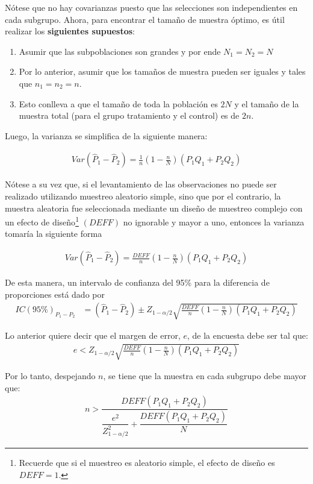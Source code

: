 \documentclass[
  12pt,
  spanish,
]{book}
\begin{document}
Nótese que no hay covarianzas puesto que las selecciones son independientes en cada subgrupo. Ahora, para encontrar el tamaño de muestra óptimo, es útil realizar los \textbf{siguientes supuestos}:

\begin{enumerate}
\item Asumir que las subpoblaciones son grandes y por ende $N_1=N_2=N$
\item Por lo anterior, asumir que los tamaños de muestra pueden ser iguales y tales que $n_1=n_2=n$. 
\item Esto conlleva a que el tamaño de toda la población es $2N$ y el tamaño de la muestra total (para el grupo tratamiento y el control) es de $2n$.
\end{enumerate}

Luego, la varianza se simplifica de la siguiente manera:

\begin{align}
Var(\hat{P}_1-\hat{P}_2)=\frac{1}{n}\left(1-\frac{n}{N}\right)(P_1Q_1+P_2Q_2)
\end{align}

Nótese a su vez que, si el levantamiento de las observaciones no puede ser realizado utilizando muestreo aleatorio simple, sino que por el contrario, la muestra aleatoria fue seleccionada mediante un diseño de muestreo complejo con un efecto de diseño\footnote{Recuerde que si el muestreo es aleatorio simple, el efecto de diseño es $DEFF=1$.} \((DEFF)\) no ignorable y mayor a uno, entonces la varianza tomaría la siguiente forma

\begin{align}
Var(\hat{P}_1-\hat{P}_2)=\frac{DEFF}{n}\left(1-\frac{n}{N}\right)(P_1Q_1+P_2Q_2)
\end{align}

De esta manera, un intervalo de confianza del 95\% para la diferencia de proporciones está dado por
\begin{align}
IC(95\%)_{P_1-P_2}&=(\hat{P}_1-\hat{P}_2) \pm Z_{1-\alpha/2} \sqrt{\frac{DEFF}{n}\left(1-\frac{n}{N}\right)(P_1Q_1+P_2Q_2)}
\end{align}

Lo anterior quiere decir que el margen de error, \(e\), de la encuesta debe ser tal que:
\begin{align}
e< Z_{1-\alpha/2}\sqrt{\frac{DEFF}{n}\left(1-\frac{n}{N}\right)(P_1Q_1+P_2Q_2)}
\end{align}

Por lo tanto, despejando \(n\), se tiene que la muestra en cada subgrupo debe mayor que:
\begin{align}
 n> \dfrac{DEFF(P_1Q_1+P_2Q_2)}{\dfrac{e^2}{Z_{1-\alpha/2}^2}+\dfrac{DEFF(P_1Q_1+P_2Q_2)}{N}}
 \end{align}
\end{document}
